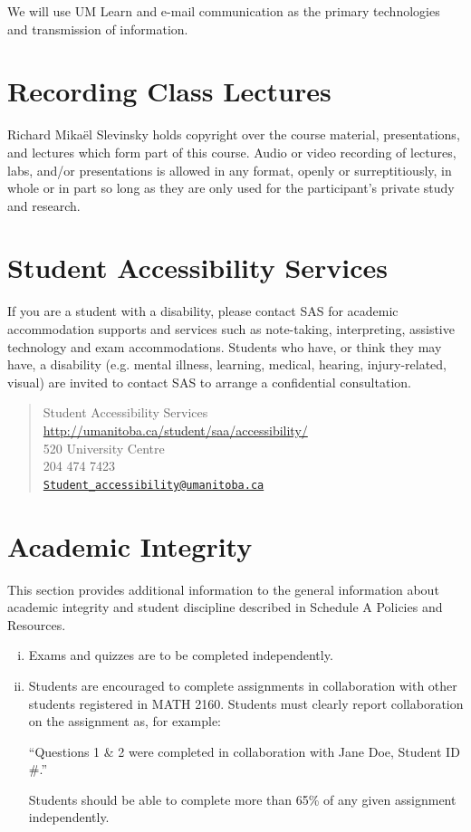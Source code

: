 \documentclass[12pt]{article}
\begin{document}
We will use UM Learn and e-mail communication as the primary technologies and transmission of information.

\section{Recording Class Lectures}

Richard Mika\"el Slevinsky holds copyright over the course material, presentations, and lectures which form part of this course.  Audio or video recording of lectures, labs, and/or presentations is allowed in any format, openly or surreptitiously, in whole or in part so long as they are only used for the participant's private study and research.

\section{Student Accessibility Services}

If you are a student with a disability, please contact SAS for academic accommodation supports and services such as note-taking, interpreting, assistive technology and exam accommodations. Students who have, or think they may have, a disability (e.g. mental illness, learning, medical, hearing, injury-related, visual) are invited to contact SAS to arrange a confidential consultation. 

\begin{quote}
Student Accessibility Services \url{http://umanitoba.ca/student/saa/accessibility/} \\
520 University Centre \\
204 474 7423 \\
\href{mailto:Student_accessibility@umanitoba.ca}{\texttt{Student\_accessibility@umanitoba.ca}}
\end{quote}

\section{Academic Integrity}

This section provides additional information to the general information about academic integrity and student discipline described in Schedule A Policies and Resources.

\begin{enumerate}[(i)]
\item Exams and quizzes are to be completed independently.

\item Students are encouraged to complete assignments in collaboration with other students registered in MATH 2160. Students must clearly report collaboration on the assignment as, for example:

``Questions 1 \& 2 were completed in collaboration with Jane Doe, Student ID \#.''

Students should be able to complete more than 65\% of any given assignment independently.
\end{enumerate}
\end{document}

